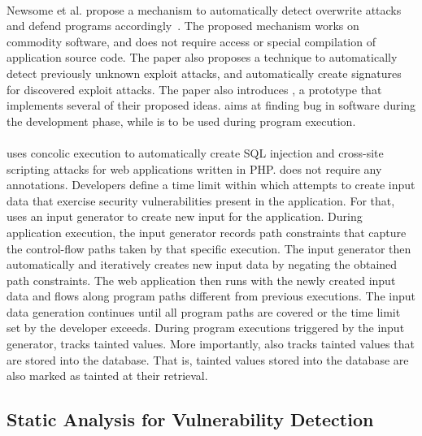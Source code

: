 \paragraph{}Newsome et al. propose a mechanism to automatically detect
overwrite attacks and defend programs accordingly~\cite{Newsome:2005:taintcheck}.
The proposed mechanism works on commodity software, and does
not require access or special compilation of application source code.
The paper also proposes a technique to automatically detect previously
unknown exploit attacks, and automatically create signatures for
discovered exploit attacks. The paper also introduces \taintcheck,
a prototype that implements several of their proposed ideas.
\waint aims at finding bug in software during the development phase,
while \taintcheck is to be used during program execution.

\paragraph{\ardilla}\cite{Kiezun:2009:Ardilla} uses concolic
execution to automatically create SQL injection and
cross-site scripting attacks for web applications written in PHP.
\ardilla does not require any annotations. Developers
define a time limit within which \ardilla attempts to
create input data that exercise security vulnerabilities
present in the application. For that, \ardilla uses an input
generator to create new input for the application.
During application execution, the input generator records path
constraints that capture the control-flow paths taken by
that specific execution. The input generator then automatically
and iteratively creates new input data by negating the
obtained path constraints.
The web application then runs with the newly created
input data and flows along program paths different from
previous executions. The input data generation continues
until all program paths are covered or the time limit set
by the developer exceeds.
During program executions triggered by the input generator,
\ardilla tracks tainted values. More importantly, \ardilla
also tracks tainted values that are stored into the database.
That is, tainted values stored into the database are also
marked as tainted at their retrieval.

\subsection{Static Analysis for Vulnerability Detection}

